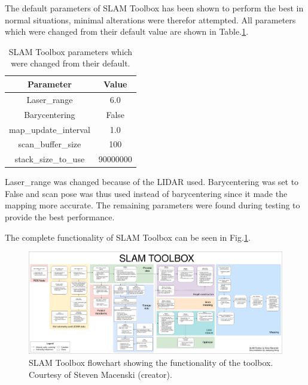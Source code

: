 

The default parameters of SLAM Toolbox has been shown to perform the best in normal situations\:\cite{macenski_slam_2021}\cite{macenski_use_2019}, minimal alterations were therefor attempted. All parameters which were changed from their default value are shown in Table.\:\ref{tab:slam_toolbox_params_changed}.
\begin{table}
    \centering
    \begin{tabular}{|c|c|} \hline
         \textbf{Parameter}         & \textbf{Value}    \\ \hline
         Laser\_range               & 6.0               \\ \hline
         Barycentering              & False             \\ \hline
         map\_update\_interval      & 1.0               \\ \hline
         scan\_buffer\_size         & 100               \\ \hline
         stack\_size\_to\_use       & 90000000          \\ \hline
    \end{tabular}
    \caption{SLAM Toolbox parameters which were changed from their default.}
    \label{tab:slam_toolbox_params_changed}
\end{table}
Laser\_range was changed because of the LIDAR used. Barycentering was set to False and scan pose was thus used instead of barycentering since it made the mapping more accurate. The remaining parameters were found during testing to provide the best performance.

The complete functionality of SLAM Toolbox can be seen in Fig.\:\ref{fig:slam_toolbox}.
\begin{figure}
    \centering
    \includegraphics[width=\textwidth]{images/slam_toolbox_sync.png}
    \caption{SLAM Toolbox flowchart showing the functionality of the toolbox. Courtesy of Steven Macenski (creator)\:\cite{macenski_slam_2021}\cite{macenski_use_2019}.}
    \label{fig:slam_toolbox}
\end{figure}

